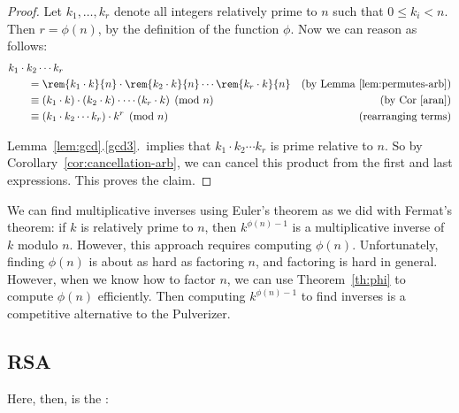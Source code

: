 \begin{proof}
Let $k_1, \dots, k_r$ denote all integers relatively prime to $n$
such that $0 \leq k_i < n$.  Then $r = \phi(n)$, by the definition of
the function $\phi$.  Now we can reason as follows:
%
\begin{align*}
\lefteqn{k_1 \cdot k_2 \cdots k_r} \hspace{0.25in} \\
& =
\rem{k_1 \cdot k}{n} \cdot 
\rem{k_2 \cdot k}{n} \cdots 
\rem{k_r \cdot k}{n} & \text{(by Lemma~\ref{lem:permutes-arb})}
\\
& \equiv 
(k_1 \cdot k) \cdot 
(k_2 \cdot k) \cdot 
\cdots 
(k_r \cdot k) \pmod{n} & \text{(by Cor~\ref{aran})}
\\
& \equiv  
(k_1 \cdot k_2 \cdots k_r) \cdot k^r \pmod{n} & \text{(rearranging terms)}
\end{align*}

Lemma~\ref{lem:gcd}.\ref{gcd3}.\ implies that $k_1 \cdot k_2
\cdots k_r$ is prime relative to $n$.  So by
Corollary~\ref{cor:cancellation-arb}, we can cancel this product from
the first and last expressions.  This proves the claim.
\end{proof}

We can find multiplicative inverses using Euler's theorem as we did
with Fermat's theorem: if $k$ is relatively prime to $n$, then
$k^{\phi(n) - 1}$ is a multiplicative inverse of $k$ modulo $n$.
However, this approach requires computing $\phi(n)$.  Unfortunately,
finding $\phi(n)$ is about as hard as factoring $n$, and factoring is
hard in general.  However, when we know how to factor $n$, we can use
Theorem~\ref{th:phi} to compute $\phi(n)$ efficiently.  Then computing
$k^{\phi(n) - 1}$ to find inverses is a competitive alternative to the
Pulverizer.

\subsection{RSA}
Here, then, is the :

